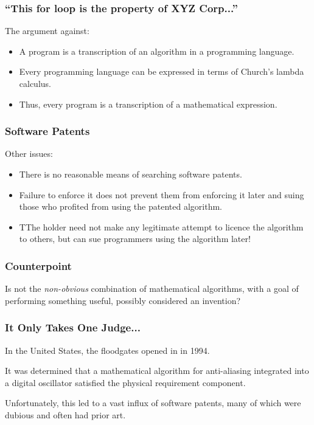 \begin{frame}
\frametitle{``This for loop is the property of XYZ Corp...''}

The argument against:

\begin{itemize}
	\item A program is a transcription of an algorithm in a programming language.
	\item Every programming language can be expressed in terms of Church's lambda calculus.
	\item Thus, every program is a transcription of a mathematical expression.
\end{itemize}

\end{frame}



\begin{frame}
\frametitle{Software Patents}

Other issues:
\begin{itemize}
	\item There is no reasonable means of searching software patents.
	\item Failure to enforce it does not prevent them from enforcing it later and suing those who profited from using the patented algorithm.
	\item TThe holder need not make any legitimate attempt to licence the algorithm to others, but can sue programmers using the algorithm later!
\end{itemize}

\end{frame}



\begin{frame}
\frametitle{Counterpoint}

Is not the \textit{non-obvious} combination of mathematical algorithms, with a goal of performing something useful, possibly considered an invention?

\end{frame}



\begin{frame}
\frametitle{It Only Takes One Judge...}

In the United States, the floodgates opened in in 1994. 

It was determined that a mathematical algorithm for anti-aliasing integrated into a digital oscillator satisfied the physical requirement component.

Unfortunately, this led to a vast influx of software patents, many of which were dubious and often had prior art.

\end{frame}



